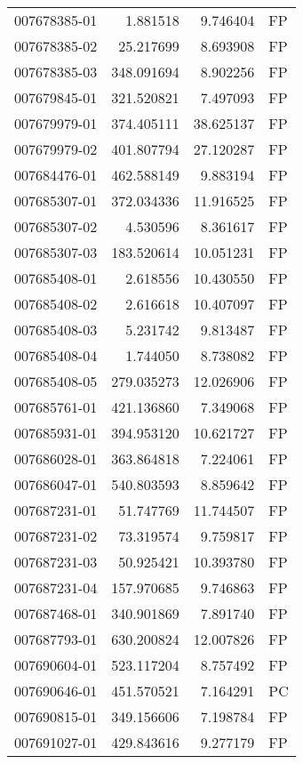 \begin{tabular}{lrrl}
007678385-01 &    1.881518 &     9.746404 &   FP \\
007678385-02 &   25.217699 &     8.693908 &   FP \\
007678385-03 &  348.091694 &     8.902256 &   FP \\
007679845-01 &  321.520821 &     7.497093 &   FP \\
007679979-01 &  374.405111 &    38.625137 &   FP \\
007679979-02 &  401.807794 &    27.120287 &   FP \\
007684476-01 &  462.588149 &     9.883194 &   FP \\
007685307-01 &  372.034336 &    11.916525 &   FP \\
007685307-02 &    4.530596 &     8.361617 &   FP \\
007685307-03 &  183.520614 &    10.051231 &   FP \\
007685408-01 &    2.618556 &    10.430550 &   FP \\
007685408-02 &    2.616618 &    10.407097 &   FP \\
007685408-03 &    5.231742 &     9.813487 &   FP \\
007685408-04 &    1.744050 &     8.738082 &   FP \\
007685408-05 &  279.035273 &    12.026906 &   FP \\
007685761-01 &  421.136860 &     7.349068 &   FP \\
007685931-01 &  394.953120 &    10.621727 &   FP \\
007686028-01 &  363.864818 &     7.224061 &   FP \\
007686047-01 &  540.803593 &     8.859642 &   FP \\
007687231-01 &   51.747769 &    11.744507 &   FP \\
007687231-02 &   73.319574 &     9.759817 &   FP \\
007687231-03 &   50.925421 &    10.393780 &   FP \\
007687231-04 &  157.970685 &     9.746863 &   FP \\
007687468-01 &  340.901869 &     7.891740 &   FP \\
007687793-01 &  630.200824 &    12.007826 &   FP \\
007690604-01 &  523.117204 &     8.757492 &   FP \\
007690646-01 &  451.570521 &     7.164291 &   PC \\
007690815-01 &  349.156606 &     7.198784 &   FP \\
007691027-01 &  429.843616 &     9.277179 &   FP \\

\end{tabular}
